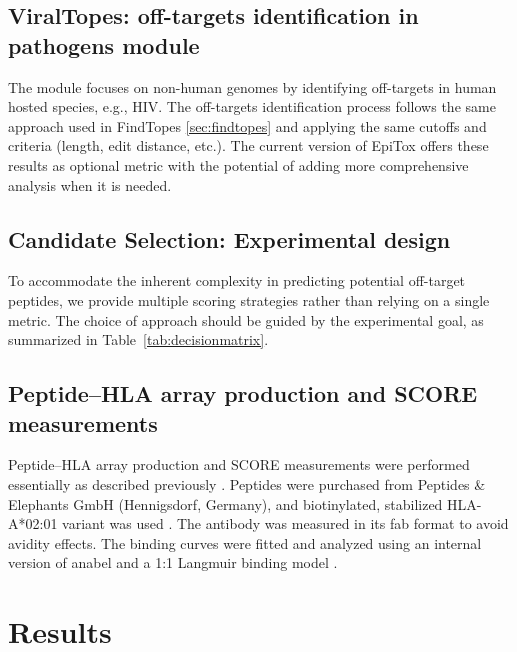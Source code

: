 \documentclass[unnumsec,webpdf,contemporary,large]{oup-authoring-template}%
\theoremstyle{thmstyleone}%
\theoremstyle{thmstyletwo}%
\theoremstyle{thmstylethree}%
\begin{document}
    \subsection{ViralTopes: off-targets identification in pathogens module}\label{sec:viraltopes}
        The module focuses on non-human genomes by identifying off-targets in human hosted species, e.g., HIV.  The off-targets identification process follows the same approach used in FindTopes \ref{sec:findtopes} and applying the same cutoffs and criteria (length, edit distance, etc.). The current version of EpiTox offers these results as optional metric with the potential of adding more comprehensive analysis when it is needed.
    
    \subsection{Candidate Selection: Experimental design}\label{sec:decisionmatrix}
        To accommodate the inherent complexity in predicting potential off-target peptides, we provide multiple scoring strategies rather than relying on a single metric. The choice of approach should be guided by the experimental goal, as summarized in Table~\ref{tab:decisionmatrix}.
    
    \subsection{Peptide–HLA array production and SCORE measurements}\label{sec:highscore}
        Peptide–HLA array production and SCORE measurements were performed essentially as described previously \cite{kramer2023ultra}. Peptides were purchased from Peptides \& Elephants GmbH (Hennigsdorf, Germany), and biotinylated, stabilized HLA-A*02:01 variant was used \cite{saini2019empty}. The antibody was measured in its fab format to avoid avidity effects. The binding curves were fitted and analyzed using an internal version of anabel and a 1:1 Langmuir binding model \cite{kramer2019anabel}.

\section{Results}\label{rslts}
\end{document}
